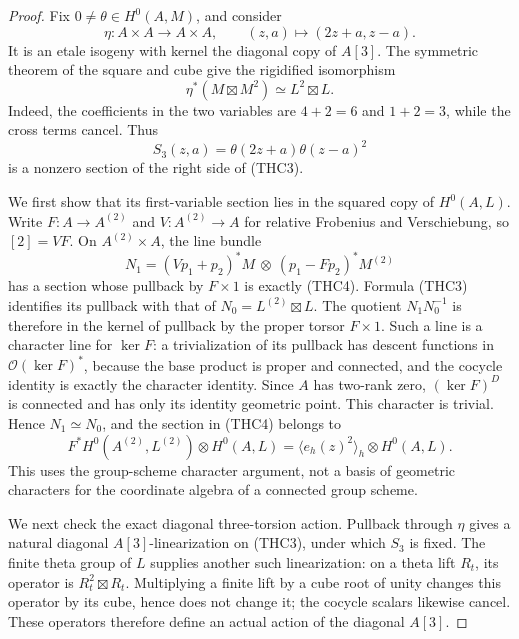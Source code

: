 \begin{proof}
Fix \(0\ne\theta\in H^0(A,M)\), and consider
\[
 \eta:A\times A\longrightarrow A\times A,
       \qquad (z,a)\longmapsto(2z+a,z-a).
                                                        \tag{THC2}
\]
It is an etale isogeny with kernel the diagonal copy of \(A[3]\).
The symmetric theorem of the square and cube give the rigidified
isomorphism
\[
 \eta^*(M\boxtimes M^2)\simeq L^2\boxtimes L.
                                                        \tag{THC3}
\]
Indeed, the coefficients in the two variables are \(4+2=6\)
and \(1+2=3\), while the cross terms cancel.  Thus
\[
            S_3(z,a)=\theta(2z+a)\theta(z-a)^2
                                                        \tag{THC4}
\]
is a nonzero section of the right side of (THC3).

We first show that its first-variable section lies in the squared
copy of \(H^0(A,L)\).  Write \(F:A\to A^{(2)}\) and
\(V:A^{(2)}\to A\) for relative Frobenius and Verschiebung,
so \([2]=VF\).  On \(A^{(2)}\times A\), the line bundle
\[
 N_1=(Vp_1+p_2)^*M\ \otimes\ (p_1-Fp_2)^*M^{(2)}
                                                        \tag{THC5}
\]
has a section whose pullback by \(F\times1\) is exactly
(THC4).  Formula (THC3) identifies its pullback with that of
\(N_0=L^{(2)}\boxtimes L\).  The quotient
\(N_1N_0^{-1}\) is therefore in the kernel of pullback by the
proper torsor \(F\times1\).  Such a line is a character line
for \(\ker F\): a trivialization of its pullback has descent
functions in \(\mathcal O(\ker F)^*\), because the base product
is proper and connected, and the cocycle identity is exactly the
character identity.  Since \(A\) has two-rank zero,
\((\ker F)^D\) is connected and has only its identity geometric
point.  This character is trivial.  Hence \(N_1\simeq N_0\),
and the section in (THC4) belongs to
\[
   F^*H^0(A^{(2)},L^{(2)})\otimes H^0(A,L)
       =\langle e_h(z)^2\rangle_h\otimes H^0(A,L).
                                                        \tag{THC6}
\]
This uses the group-scheme character argument, not a basis of
geometric characters for the coordinate algebra of a connected
group scheme.

We next check the exact diagonal three-torsion action.  Pullback
through \(\eta\) gives a natural diagonal \(A[3]\)-linearization
on (THC3), under which \(S_3\) is fixed.  The finite theta group
of \(L\) supplies another such linearization: on a theta lift
\(R_t\), its operator is \(R_t^2\boxtimes R_t\).  Multiplying
a finite lift by a cube root of unity changes this operator by
its cube, hence does not change it; the cocycle scalars likewise
cancel.  These operators therefore define an actual action of
the diagonal \(A[3]\).


\end{proof}
